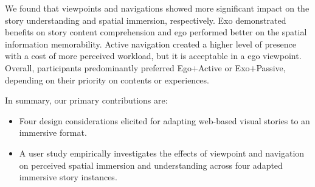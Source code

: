 We found that viewpoints and navigations showed more significant impact on the story understanding and spatial immersion, respectively. Exo demonstrated benefits on story content comprehension and ego performed better on the spatial information memorability. Active navigation created a higher level of presence with a cost of more perceived workload, but it is acceptable in a ego viewpoint. Overall, participants predominantly preferred Ego$+$Active or Exo$+$Passive, depending on their priority on contents or experiences.

In summary, our primary contributions are:
\begin{itemize}
    \item {Four design considerations elicited for adapting web-based visual stories to an immersive format.}
    \item A user study empirically investigates the effects of viewpoint and navigation on perceived spatial immersion and understanding {across four adapted immersive story instances}.
\end{itemize}